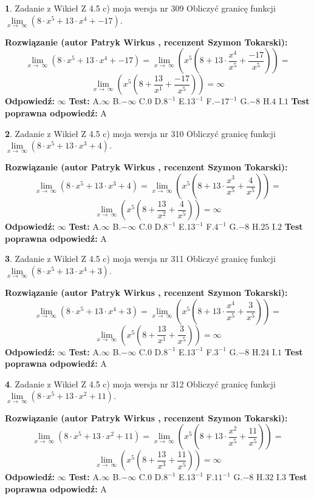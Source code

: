 \documentclass[12pt, a4paper]{article}
\theoremstyle{definition} %
\newtheorem{zad}{}
\newcommand{\zadStart}[1]{\begin{zad}#1\newline}
\newcommand{\zadStop}{\end{zad}}
\newcommand{\rozwStart}[2]{\noindent \textbf{Rozwiązanie (autor #1 , recenzent #2): }\newline}
\newcommand{\rozwStop}{\newline}
\newcommand{\odpStart}{\noindent \textbf{Odpowiedź:}\newline}
\newcommand{\odpStop}{\newline}
\newcommand{\testStart}{\noindent \textbf{Test:}\newline}
\newcommand{\testStop}{\newline}
\newcommand{\kluczStart}{\noindent \textbf{Test poprawna odpowiedź:}\newline}
\newcommand{\kluczStop}{\newline}
\begin{document}
\zadStart{Zadanie z Wikieł Z 4.5 c) moja wersja nr 309}
Obliczyć granicę funkcji  $\lim\limits_{x\to\ \infty}(8 \cdot x^{5}+13 \cdot x^{4}+-17)$.
\zadStop
\rozwStart{Patryk Wirkus}{Szymon Tokarski}
$$\lim\limits_{x\to\ \infty}(8 \cdot x^{5}+13 \cdot x^{4}+-17) = \lim\limits_{x\to\ \infty}(x^{5}(8 +13 \cdot \frac{x^{4}}{x^{5}}+\frac{-17}{x^{5}})) =$$ $$\lim\limits_{x\to\ \infty}(x^{5}(8 +\frac{13}{x^{1}}+\frac{-17}{x^{5}})) =\infty$$
\rozwStop
\odpStart
$\infty$
\odpStop
\testStart
A.$\infty$ B.$-\infty$ C.$0$ D.$8^{-1}$ E.$13^{-1}$
F.$-17^{-1}$ G.$-8$
H.$4$
I.$1$
\testStop
\kluczStart
A
\kluczStop



\zadStart{Zadanie z Wikieł Z 4.5 c) moja wersja nr 310}
Obliczyć granicę funkcji  $\lim\limits_{x\to\ \infty}(8 \cdot x^{5}+13 \cdot x^{3}+4)$.
\zadStop
\rozwStart{Patryk Wirkus}{Szymon Tokarski}
$$\lim\limits_{x\to\ \infty}(8 \cdot x^{5}+13 \cdot x^{3}+4) = \lim\limits_{x\to\ \infty}(x^{5}(8 +13 \cdot \frac{x^{3}}{x^{5}}+\frac{4}{x^{5}})) =$$ $$\lim\limits_{x\to\ \infty}(x^{5}(8 +\frac{13}{x^{2}}+\frac{4}{x^{5}})) =\infty$$
\rozwStop
\odpStart
$\infty$
\odpStop
\testStart
A.$\infty$ B.$-\infty$ C.$0$ D.$8^{-1}$ E.$13^{-1}$
F.$4^{-1}$ G.$-8$
H.$25$
I.$2$
\testStop
\kluczStart
A
\kluczStop



\zadStart{Zadanie z Wikieł Z 4.5 c) moja wersja nr 311}
Obliczyć granicę funkcji  $\lim\limits_{x\to\ \infty}(8 \cdot x^{5}+13 \cdot x^{4}+3)$.
\zadStop
\rozwStart{Patryk Wirkus}{Szymon Tokarski}
$$\lim\limits_{x\to\ \infty}(8 \cdot x^{5}+13 \cdot x^{4}+3) = \lim\limits_{x\to\ \infty}(x^{5}(8 +13 \cdot \frac{x^{4}}{x^{5}}+\frac{3}{x^{5}})) =$$ $$\lim\limits_{x\to\ \infty}(x^{5}(8 +\frac{13}{x^{1}}+\frac{3}{x^{5}})) =\infty$$
\rozwStop
\odpStart
$\infty$
\odpStop
\testStart
A.$\infty$ B.$-\infty$ C.$0$ D.$8^{-1}$ E.$13^{-1}$
F.$3^{-1}$ G.$-8$
H.$24$
I.$1$
\testStop
\kluczStart
A
\kluczStop



\zadStart{Zadanie z Wikieł Z 4.5 c) moja wersja nr 312}
Obliczyć granicę funkcji  $\lim\limits_{x\to\ \infty}(8 \cdot x^{5}+13 \cdot x^{2}+11)$.
\zadStop
\rozwStart{Patryk Wirkus}{Szymon Tokarski}
$$\lim\limits_{x\to\ \infty}(8 \cdot x^{5}+13 \cdot x^{2}+11) = \lim\limits_{x\to\ \infty}(x^{5}(8 +13 \cdot \frac{x^{2}}{x^{5}}+\frac{11}{x^{5}})) =$$ $$\lim\limits_{x\to\ \infty}(x^{5}(8 +\frac{13}{x^{3}}+\frac{11}{x^{5}})) =\infty$$
\rozwStop
\odpStart
$\infty$
\odpStop
\testStart
A.$\infty$ B.$-\infty$ C.$0$ D.$8^{-1}$ E.$13^{-1}$
F.$11^{-1}$ G.$-8$
H.$32$
I.$3$
\testStop
\kluczStart
A
\kluczStop
\end{document}

